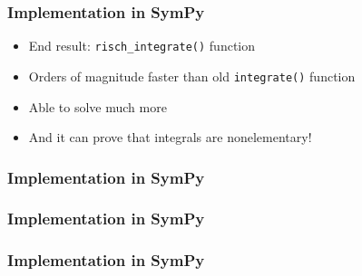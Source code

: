 \documentclass{beamer}
\numberwithin{equation}{section} %
\newcommand{\rischintegrate}{\texttt{risch\_integrate()}}
\begin{document}
\begin{frame}
    \frametitle{Implementation in SymPy}
    \begin{itemize}
        \item End result: \rischintegrate{} function
        \pause
        \item Orders of magnitude faster than old \texttt{integrate()} function
        \item Able to solve much more
        \item And it can prove that integrals are nonelementary!
    \end{itemize}
\end{frame}
\begin{frame}
    \frametitle{Implementation in SymPy}
    \begin{figure}[t!]
    \end{figure}
\end{frame}

\begin{frame}
    \frametitle{Implementation in SymPy}
    \begin{figure}
    \begin{flushleft}
    \end{flushleft}
    \end{figure}
\end{frame}

\begin{frame}
    \frametitle{Implementation in SymPy}
    \begin{figure}
    \begin{flushleft}
    \end{flushleft}
    \end{figure}
\end{frame}
\end{document}
